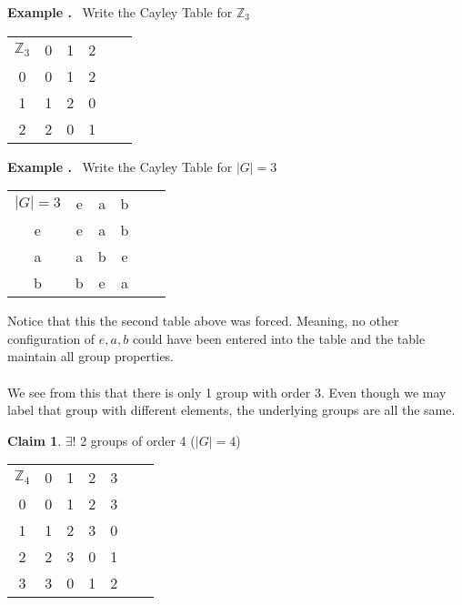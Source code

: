 \documentclass{article}
\newcounter{example}
\newcounter{claim}
\newcounter{solution}
\theoremstyle{definition}
\theoremstyle{claim}
\newtheorem{claim}{Claim}[section]
\theoremstyle{remark}
\newcommand\Example{%
  \stepcounter{example}%
  \textbf{Example \theexample.}~%
  \setcounter{solution}{0}%
}
\begin{document}
\begin{flushleft}
\Example Write the Cayley Table for $\mathbb{Z}_{3}$\\
 \begin{center}
\setlength\extrarowheight{3pt}
\begin{tabular}{c | c c c c c}
    $\mathbb{Z}_{3}$ & 0 & 1 & 2  \\
    \cline{1-4}
    0 & 0 & 1 & 2  \\
    1 & 1 & 2 & 0  \\
    2 & 2 & 0 & 1  \\
\end{tabular}
\end{center}

\Example Write the Cayley Table for $|G|=3$\\
 \begin{center}

\setlength\extrarowheight{3pt}
\begin{tabular}{c | c c c c c}
    $|G|=3$ & e & a & b  \\
    \cline{1-4}
    e & e & a & b  \\
    a & a & b & e  \\
    b & b & e & a  \\
\end{tabular}
\end{center}
Notice that this the second table above was forced. Meaning, no other configuration of $e,a,b$ could have been entered into the table and the table maintain all group properties.\\\\
We see from this that there is only 1 group with order 3. Even though we may label that group with different elements, the underlying groups are all the same.

\begin{claim}{}
$\exists$! 2 groups of order 4 ($|G|=4$)
\end{claim}

\begin{center}
\setlength\extrarowheight{3pt}
\begin{tabular}{c | c c c c c c}
    $\mathbb{Z}_{4}$ & 0 & 1 & 2 & 3  \\
    \cline{1-5}
    0 & 0 & 1 & 2 & 3  \\
    1 & 1 & 2 & 3 & 0 	\\
    2 & 2 & 3 & 0 & 1	\\
    3 & 3 & 0 & 1 & 2	\\
\end{tabular}
\end{center}


\end{flushleft}
\end{document}
